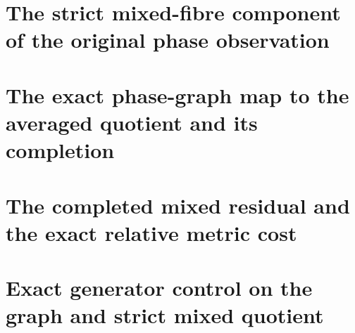\documentclass[11pt,a4paper,oneside,openany]{book}
\theoremstyle{definition}
\begin{document}
\chapter{The strict mixed-fibre component of the original phase observation}
\begingroup

\endgroup
\chapter{The exact phase-graph map to the averaged quotient and its completion}
\begingroup

\endgroup
\chapter{The completed mixed residual and the exact relative metric cost}
\begingroup

\endgroup
\chapter{Exact generator control on the graph and strict mixed quotient}
\begingroup

\endgroup
\end{document}
